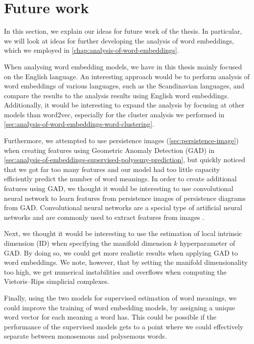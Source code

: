 \section{Future work}
\label{sec:future-work}
In this section, we explain our ideas for future work of the thesis. In particular, we will look at ideas for further developing the analysis of word embeddings, which we employed in \cref{chap:analysis-of-word-embeddings}.

When analysing word embedding models, we have in this thesis mainly focused on the English language. An interesting approach would be to perform analysis of word embeddings of various languages, such as the Scandinavian languages, and compare the results to the analysis results using English word embeddings. Additionally, it would be interesting to expand the analysis by focusing at other models than word2vec, especially for the cluster analysis we performed in \cref{sec:analysis-of-word-embeddings-word-clustering}.

Furthermore, we attempted to use persistence images (\cref{sec:persistence-image}) when creating features using Geometric Anomaly Detection (GAD) in \cref{sec:analysis-of-embeddings-supervised-polysemy-prediction}, but quickly noticed that we got far too many features and our model had too little capacity efficiently predict the number of word meanings. In order to create additional features using GAD, we thought it would be interesting to use convolutional neural network to learn features from persistence images of persistence diagrams from GAD. Convolutional neural networks are a special type of artificial neural networks and are commonly used to extract features from images \cite[Chapter 8]{Aggarwal18}.

Next, we thought it would be interesting to use the estimation of local intrinsic dimension (ID) when specifying the manifold dimension $k$ hyperparameter of GAD. By doing so, we could get more realistic results when applying GAD to word embeddings. We note, however, that by setting the manifold dimensionality too high, we get numerical instabilities and overflows when computing the Vietoris–Rips simplicial complexes.

Finally, using the two models for supervised estimation of word meanings, we could improve the training of word embedding models, by assigning a unique word vector for each meaning a word has. This could be possible if the performance of the supervised models gets to a point where we could effectively separate between monosemous and polysemous words.
